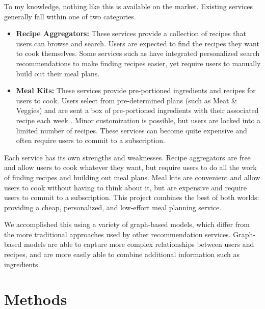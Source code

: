 \documentclass{article}
\begin{document}
To my knowledge, nothing like this is available on the market. Existing services generally fall within one of two categories.

\begin{itemize}

  \item \textbf{Recipe Aggregators:} These services provide a collection of recipes that users can browse and search. Users are expected to find the recipes they want to cook themselves. Some services such as \citet{yummly} have integrated personalized search recommendations to make finding recipes easier, yet require users to manually build out their meal plans.
        
  \item \textbf{Meal Kits:} These services provide pre-portioned ingredients and recipes for users to cook. Users select from pre-determined plans (such as Meat \& Veggies) and are sent a box of pre-portioned ingredients with their associated recipe each week \citep{hellofresh}. Minor customization is possible, but users are locked into a limited number of recipes. These services can become quite expensive and often require users to commit to a subscription.
        
\end{itemize}

Each service has its own strengths and weaknesses. Recipe aggregators are free and allow users to cook whatever they want, but require users to do all the work of finding recipes and building out meal plans. Meal kits are convenient and allow users to cook without having to think about it, but are expensive and require users to commit to a subscription. This project combines the best of both worlds: providing a cheap, personalized, and low-effort meal planning service.

We accomplished this using a variety of graph-based models, which differ from the more traditional approaches used by other recommendation services. Graph-based models are able to capture more complex relationships between users and recipes, and are more easily able to combine additional information such as ingredients.

\section{Methods}
\end{document}
